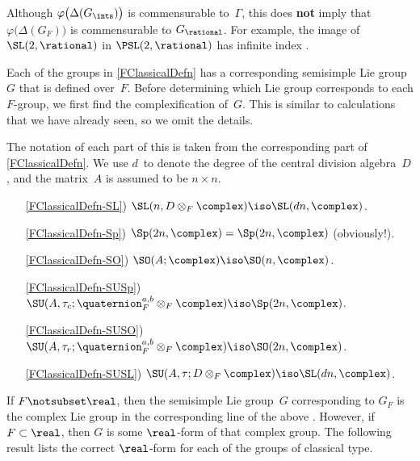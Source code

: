 \begin{warn}
Although $\varphi \bigl( \Delta(G_{\ints}) \bigr)$ is commensurable to~$\Gamma$, this does \textbf{not} imply that $\varphi \bigl( \Delta(G_F) \bigr)$ is
commensurable to $G_\rational$. For example, the image of
$\SL(2,\rational)$ in $\PSL(2,\rational)$ has infinite index
.
 \end{warn}

Each of the groups in \cref{FClassicalDefn} has a corresponding semisimple Lie group~$G$ that is defined over~$F$. Before determining which Lie group corresponds to each $F$-group, we first find the complexification of~$G$. This is
similar to calculations that we have already seen,
so we omit the details.

\begin{prop} \label{GFxC}
 The notation of each part of this  is taken from the corresponding part of \cref{FClassicalDefn}. 
 We use $d$~to denote the
degree of the central division algebra~$D$, and the matrix~$A$ is assumed to be $n \times n$.
 \begin{enumerate}
 \item[\ref{FClassicalDefn-SL})]
 $\SL(n,D \otimes_F \complex) \iso \SL(dn,\complex)$.
 \item[\ref{FClassicalDefn-Sp})]
 $\Sp(2n, \complex) = \Sp(2n,\complex)$ \textup(obviously!\/\textup).
 \item[\ref{FClassicalDefn-SO})]
 $\SO(A;\complex) \iso \SO(n,\complex)$.
 \item[\ref{FClassicalDefn-SUSp})]
 $\SU(A,\tau_c; \quaternion^{a,b}_F \otimes_F \complex) \iso \Sp(2n,\complex)$.
 \item[\ref{FClassicalDefn-SUSO})]
 $\SU(A,\tau_r; \quaternion^{a,b}_F \otimes_F \complex) \iso \SO(2n,\complex)$.
 \item[\ref{FClassicalDefn-SUSL})]
 $\SU(A,\tau; D \otimes_F \complex) \iso \SL(dn,\complex)$.
 \end{enumerate}
 \end{prop}

If $F \notsubset \real$, then the semisimple Lie group~$G$ corresponding to $G_F$ is the complex Lie group in the corresponding line of the above %
. However, if $F \subset \real$, then $G$ is some $\real$-form of that complex group. The following result lists the correct $\real$-form for each of the groups of classical type.


